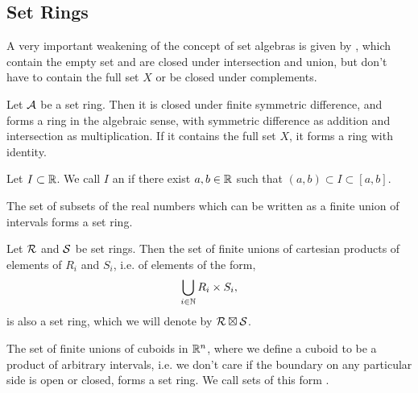 \subsection{Set Rings}
A very important weakening of the concept of set algebras is given by , which contain the empty set and are closed under intersection and union, but don't have to contain the full set $X$ or be closed under complements.
\begin{theorem}
	Let $\mathcal{A}$ be a set ring. Then it is closed under finite symmetric difference, and forms a ring in the algebraic sense, with symmetric difference as addition and intersection as multiplication. If it contains the full set $X$, it forms a ring with identity.
\end{theorem}
\begin{definition}
	Let $I \subset \mathbb{R}$. We call $I$ an  if there exist $a,b \in \mathbb{R}$ such that $(a,b) \subset I \subset [a,b]$. 
\end{definition}
\begin{theorem}
	The set of subsets of the real numbers which can be written as a finite union of intervals forms a set ring.
\end{theorem}
\begin{theorem}
	Let $\mathcal{R}$ and $\mathcal{S}$ be set rings. Then the set of finite unions of cartesian products of elements of $R_i$ and $S_i$, i.e. of elements of the form,
	\begin{align*}
		\bigcup_{i \in \mathbb{N}} R_i \times S_i,
	\end{align*}
	is also a set ring, which we will denote by $\mathcal{R} \boxtimes \mathcal{S}$.
\end{theorem}
\begin{corollary}
	The set of finite unions of cuboids in $\mathbb{R}^n$, where we define a cuboid to be a product of arbitrary intervals, i.e. we don't care if the boundary on any particular side is open or closed, forms a set ring. We call sets of this form .
\end{corollary}
